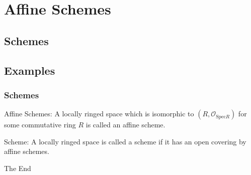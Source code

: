 \documentclass{beamer}
\begin{document}
\section{Affine Schemes}
\subsection{Schemes}
\subsection{Examples}

\begin{frame}
    \frametitle{Schemes}
        Affine Schemes: A locally ringed space which is isomorphic to $(R, \mathcal{O}_{\text{Spec} R})$
        for some commutative ring $R$ is called an affine scheme.
        
        \vspace*{5mm}

        Scheme: A locally ringed space is called a scheme if it has an open
        covering by affine schemes.
    \end{frame}


\begin{frame}
\Huge{\centerline{The End}}
\end{frame}

\end{document}
